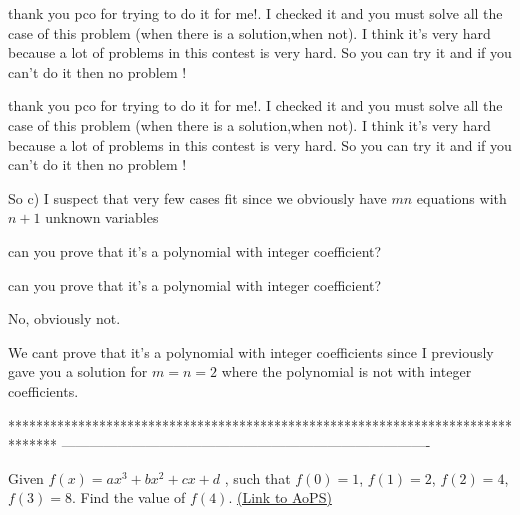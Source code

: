 \begin{solution}
	thank you pco for trying to do it for me!.  I checked it and you must solve all the case of this problem (when there is a solution,when not). I think it's very hard because a lot of problems in this contest is very hard. So you can try it and  if you can't do it then no problem !
\end{solution}



\begin{solution}
	\begin{tcolorbox}thank you pco for trying to do it for me!.  I checked it and you must solve all the case of this problem (when there is a solution,when not). I think it's very hard because a lot of problems in this contest is very hard. So you can try it and  if you can't do it then no problem !\end{tcolorbox}
So c)
I suspect that very few cases fit since we obviously have $mn$ equations with $n+1$ unknown variables
\end{solution}



\begin{solution}
	can you prove that it's a polynomial with integer coefficient?
\end{solution}



\begin{solution}
	\begin{tcolorbox}can you prove that it's a polynomial with integer coefficient?\end{tcolorbox}
No, obviously not.

We cant prove that it's a polynomial with integer coefficients since I previously gave you a solution for $m=n=2$ where the polynomial is not with integer coefficients.
\end{solution}
*******************************************************************************
-------------------------------------------------------------------------------

\begin{problem}
	Given $f(x) = ax^3 + bx^2 + cx + d$ , such that $f(0) = 1$, $f(1) = 2$, $f(2) = 4$, $f(3) = 8$. Find the value of $f(4)$.
	\flushright \href{https://artofproblemsolving.com/community/c6h407360}{(Link to AoPS)}
\end{problem}



